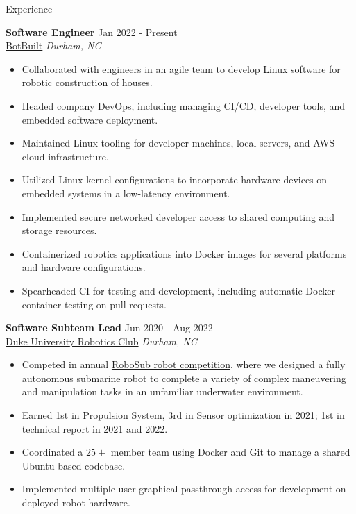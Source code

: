 \documentclass{resume}
\begin{document}
\begin{rSection}{Experience}

\textbf{Software Engineer} \hfill Jan 2022 - Present\\
\href{https://botbuilt.com}{BotBuilt} \hfill \textit{Durham, NC}
\begin{itemize}
    \itemsep -3pt {} 
    \item Collaborated with engineers in an agile team to develop Linux software for robotic construction of houses.
    \item Headed company DevOps, including managing CI/CD, developer tools, and embedded software deployment.
    \item Maintained Linux tooling for developer machines, local servers, and AWS cloud infrastructure.
    \item Utilized Linux kernel configurations to incorporate hardware devices on embedded systems in a low-latency environment.
    \item Implemented secure networked developer access to shared computing and storage resources.
    \item Containerized robotics applications into Docker images for several platforms and hardware configurations.
    \item Spearheaded CI for testing and development, including automatic Docker container testing on pull requests.
    \end{itemize}
 
\textbf{Software Subteam Lead} \hfill Jun 2020 - Aug 2022\\
\href{https://duke-robotics.com/}{Duke University Robotics Club} \hfill \textit{Durham, NC}
\begin{itemize}
    \itemsep -3pt {} 
    \item Competed in annual \href{https://robonation.org/programs/robosub/}{RoboSub robot competition}, where we designed a fully autonomous submarine robot to complete a variety of complex maneuvering and manipulation tasks in an unfamiliar underwater environment.
    \item Earned 1st in Propulsion System, 3rd in Sensor optimization in 2021; 1st in technical report in 2021 and 2022.    
    \item Coordinated a $25+$ member team using Docker and Git to manage a shared Ubuntu-based codebase.
    \item Implemented multiple user graphical passthrough access for development on deployed robot hardware.
\end{itemize}


\end{rSection}
\end{document}
